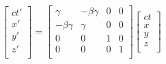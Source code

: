 \documentclass{article}
\begin{document}
$\begin{bmatrix}
ct\prime \\
x\prime \\
y\prime \\
z\prime \\
\end{bmatrix}= \begin{bmatrix}
\gamma & -\beta\gamma & 0 & 0 \\
-\beta\gamma & \gamma & 0 & 0 \\
0 & 0 & 1 & 0 \\
0 & 0 & 0 & 1 \\
 \end{bmatrix}
\begin{bmatrix}
ct \\
x \\
y \\
z \\
\end{bmatrix}$
\end{document}

